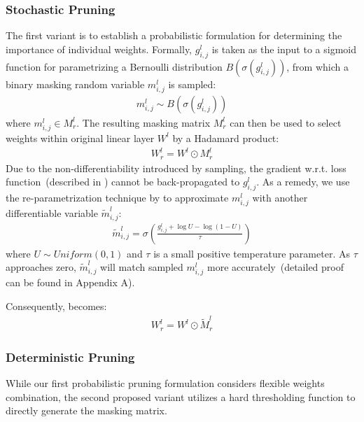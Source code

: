 \subsubsection{Stochastic Pruning}
\label{sec:stochastic}
The first variant is to establish a probabilistic formulation for determining the importance of individual weights. 
Formally, $g_{i,j}^l$ is taken as the input to a sigmoid function for parametrizing a Bernoulli 
distribution $B(\sigma(g_{i,j}^l))$, from which a binary masking random variable $m_{i,j}^l$ is sampled:
\begin{align}
	m_{i,j}^l\sim B(\sigma(g_{i,j}^l))
	\label{eq:bernoulli}
\end{align}
where $m_{i,j}^l\in M_r^l$. The resulting masking matrix $M_{r}^{l}$ 
can then be used to select weights within original linear layer $W^l$ 
by a Hadamard product:
\begin{align}
	W_r^l = W^l \odot M_r^l
	\label{eq:mask}
\end{align}
Due to the non-differentiability introduced by sampling, the gradient w.r.t. loss function~(described in ) cannot be back-propagated to $g_{i,j}^l$. As a remedy, we use the re-parametrization 
technique by \citet{Li2018} to approximate $m_{i,j}^l$ with another 
differentiable variable $\tilde{m}_{i,j}^l$:
\begin{align}
	\tilde{m}_{i,j}^l=\sigma(\frac{g_{i,j}^l+\log{U}-\log{(1-U)}}{\tau})
\end{align}
where $U\sim Uniform(0,1)$ and $\tau$ is a small positive temperature parameter. As $\tau$ approaches zero, $\tilde{m}_{i,j}^l$ will match sampled $m_{i,j}^l$ more accurately~(detailed proof can be found in Appendix A). 

Consequently,  becomes:
\begin{align}
	W_r^l = W^l \odot \tilde{M}_r^l
	\label{eq:soft}
\end{align}
\subsubsection{Deterministic Pruning}
\label{sec:deterministic}
While our first probabilistic pruning formulation considers flexible weights combination, the second proposed variant utilizes a hard thresholding function to directly generate the masking matrix.

